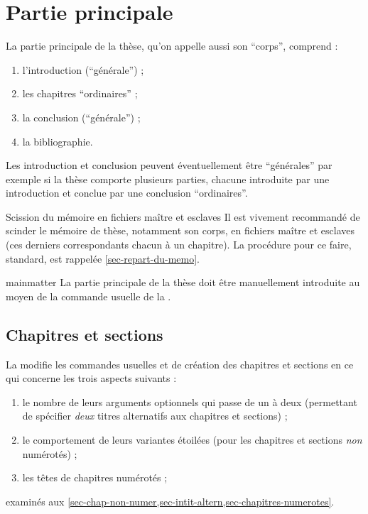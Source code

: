 \mainmatter
\chapter{Partie principale}\label{cha-corps}
%

La partie principale de la thèse, qu'on appelle aussi son \enquote{corps},
comprend :
\begin{enumerate}
\item{}%
 l'introduction (\enquote{générale}) ;
\item{}%
  les chapitres \enquote{ordinaires} ;
\item{}%
  la conclusion (\enquote{générale}) ;
\item{}%
  la bibliographie.
\end{enumerate}
Les introduction et conclusion peuvent éventuellement être
\enquote{générales} par exemple si la thèse comporte plusieurs
parties, chacune introduite par une introduction et conclue par
une conclusion \enquote{ordinaires}.

\begin{dbremark}{Scission du mémoire en fichiers maître et esclaves}{}
  Il est vivement recommandé de scinder le mémoire de thèse,
  notamment son corps, en fichiers maître et esclaves (ces derniers
  correspondants chacun à un chapitre). La procédure
  pour ce faire, standard, est rappelée \vref{sec-repart-du-memo}.
\end{dbremark}

\begin{docCommand}[doc description=\mandatory]{mainmatter}{}
  La partie principale de la thèse doit être manuellement introduite au moyen
  de la commande usuelle  de la
  \nofrontmatter.
\end{docCommand}

\section{Chapitres et sections}

La \yatCl{} modifie les commandes usuelles  et
 de création des chapitres et sections en ce qui concerne
les trois aspects suivants :
\begin{enumerate}
\item le nombre de leurs arguments optionnels qui passe de un à deux (permettant
  de spécifier \emph{deux} titres alternatifs aux chapitres et sections) ;
\item le comportement de leurs variantes étoilées (pour les chapitres et
  sections \emph{non} numérotés) ;
\item les têtes de chapitres numérotés ;
\end{enumerate}
examinés aux \vref{sec-chap-non-numer,sec-intit-altern,sec-chapitres-numerotes}.

